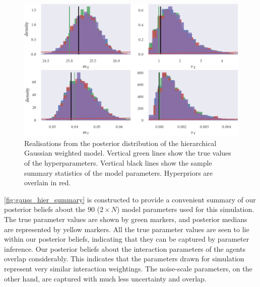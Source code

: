 \begin{figure}[tbp]
  \includegraphics{gauss_hier_hist_hypers.pdf}
  \caption{Realisations from the posterior distribution of the hierarchical
    Gaussian weighted model. Vertical green lines show the true values of the
    hyperparameters. Vertical black lines show the sample summary statistics
    of the model parameters. Hyperpriors are overlain in red.}
  \label{fig:gauss_hier_hist}
\end{figure}

\cref{fig:gauss_hier_summary} is constructed to provide a convenient summary of
our posterior beliefs about the $90$ ($2\times N$) model parameters used for this
simulation. The true parameter values are shown by green markers, and posterior
medians are represented by yellow markers. All the true parameter values are
seen to lie within our posterior beliefs, indicating that they can be captured
by parameter inference. Our posterior beliefs about the interaction parameters
of the agents overlap considerably. This indicates that the parameters drawn
for simulation represent very similar interaction weightings. The noise-scale
parameters, on the other hand, are captured with much less uncertainty and
overlap.


